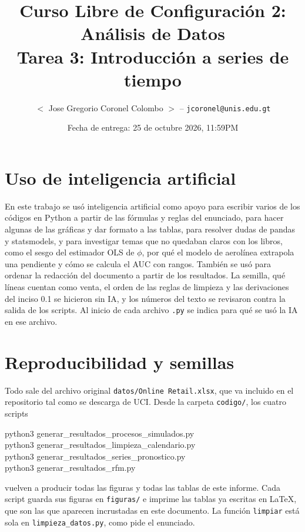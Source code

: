 \documentclass[11pt]{article}
\title{Curso Libre de Configuración 2: Análisis de Datos\\ Tarea 3: Introducción a series de tiempo}
\author{$<$ Jose Gregorio Coronel Colombo $>$ -- \texttt{jcoronel@unis.edu.gt}}
\date{Fecha de entrega: 25 de octubre 2026, 11:59PM}
\begin{document}
\maketitle

\section*{Uso de inteligencia artificial}

En este trabajo se usó inteligencia artificial como apoyo para escribir varios de los códigos
en Python a partir de las fórmulas y reglas del enunciado, para hacer algunas de las gráficas y
dar formato a las tablas, para resolver dudas de pandas y statsmodels, y para investigar temas
que no quedaban claros con los libros, como el sesgo del estimador OLS de $\phi$, por qué el
modelo de aerolínea extrapola una pendiente y cómo se calcula el AUC con rangos. También se usó
para ordenar la redacción del documento a partir de los resultados. La semilla, qué líneas
cuentan como venta, el orden de las reglas de limpieza y las derivaciones del inciso 0.1 se
hicieron sin IA, y los números del texto se revisaron contra la salida de los scripts. Al inicio
de cada archivo \texttt{.py} se indica para qué se usó la IA en ese archivo.

\section*{Reproducibilidad y semillas}

Todo sale del archivo original \texttt{datos/Online Retail.xlsx}, que va incluido en el
repositorio tal como se descarga de UCI. Desde la carpeta \texttt{codigo/}, los cuatro scripts

\begin{center}\ttfamily
python3 generar\_resultados\_procesos\_simulados.py\\
python3 generar\_resultados\_limpieza\_calendario.py\\
python3 generar\_resultados\_series\_pronostico.py\\
python3 generar\_resultados\_rfm.py
\end{center}

\noindent
vuelven a producir todas las figuras y todas las tablas de este informe. Cada script guarda sus
figuras en \texttt{figuras/} e imprime las tablas ya escritas en \LaTeX{}, que son las que
aparecen incrustadas en este documento. La función \texttt{limpiar} está sola en
\texttt{limpieza\_datos.py}, como pide el enunciado.
\end{document}
